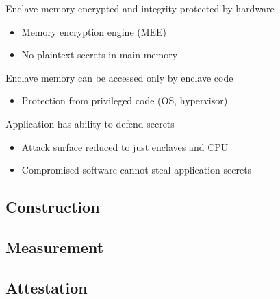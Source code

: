 Enclave memory encrypted and integrity-protected by hardware
\begin{itemize}
   \item Memory encryption engine (MEE)
   \item No plaintext secrets in main memory
\end{itemize}

Enclave memory can be accessed only by enclave code
\begin{itemize}
   \item Protection from privileged code (OS, hypervisor)
\end{itemize}

Application has ability to defend secrets
\begin{itemize}
   \item Attack surface reduced to just enclaves and CPU
   \item Compromised software cannot steal application secrets
\end{itemize}

\subsection{Construction}
\subsection{Measurement}
\subsection{Attestation}
